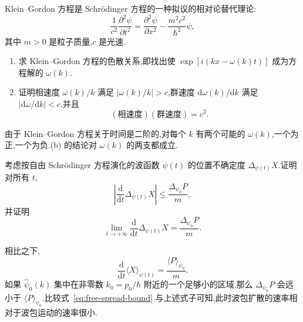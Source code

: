 \begin{exercise}\label{ex:klein-gordon}
Klein--Gordon 方程是 Schrödinger 方程的一种拟议的相对论替代理论:
\[
\frac{1}{c^{2}}\frac{\partial^{2}\psi}{\partial t^{2}}
=\frac{\partial^{2}\psi}{\partial x^{2}}-\frac{m^{2}c^{2}}{\hbar^{2}}\psi,
\]
其中 \(m>0\) 是粒子质量,\(c\) 是光速.
\begin{enumerate}
\item 求 Klein--Gordon 方程的色散关系,即找出使 \(\exp[i(kx-\omega(k)t)]\) 成为方程解的 \(\omega(k)\).
\item 证明相速度 \(\omega(k)/k\) 满足 \(|\omega(k)/k|>c\),群速度 \(\mathrm{d}\omega(k)/\mathrm{d}k\) 满足 \(|\mathrm{d}\omega/\mathrm{d}k|<c\),并且
\[
(\text{相速度})(\text{群速度})=c^{2}.
\]
\end{enumerate}
\begin{note}
由于 Klein--Gordon 方程关于时间是二阶的,对每个 \(k\) 有两个可能的 \(\omega(k)\),一个为正,一个为负.(b) 的结论对 \(\omega(k)\) 的两支都成立.
\end{note}
\end{exercise}

\begin{exercise}\label{ex:free-spread-rate}
考虑按自由 Schrödinger 方程演化的波函数 \(\psi(t)\) 的位置不确定度 \(\Delta_{\psi(t)}X\).证明对所有 \(t\),
\begin{equation}
\left|\frac{\mathrm{d}}{\mathrm{d}t}\Delta_{\psi(t)}X\right|
\le\frac{\Delta_{\psi_{0}}P}{m},
\label{eq:free-spread-bound}
\end{equation}
并证明
\[
\lim_{t\to+\infty}\frac{\mathrm{d}}{\mathrm{d}t}\Delta_{\psi(t)}X
=\frac{\Delta_{\psi_{0}}P}{m}.
\]
\begin{note}
相比之下,
\[
\frac{\mathrm{d}}{\mathrm{d}t}\langle X\rangle_{\psi(t)}
=\frac{\langle P\rangle_{\psi_{0}}}{m}.
\]
如果 \(\widehat{\psi}_{0}(k)\) 集中在非零数 \(k_{0}=p_{0}/\hbar\) 附近的一个足够小的区域,那么 \(\Delta_{\psi_{0}}P\) 会远小于 \(\langle P\rangle_{\psi_{0}}\).比较式~\eqref{eq:free-spread-bound} 与上述式子可知,此时波包扩散的速率相对于波包运动的速率很小.
\end{note}
\end{exercise}
